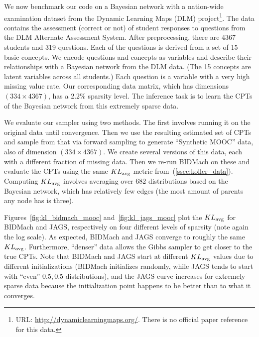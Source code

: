 \documentclass{article} %
\begin{document}
We now benchmark our code on a Bayesian network with a nation-wide examination dataset from the
Dynamic Learning Maps (DLM) project\footnote{URL: \url{http://dynamiclearningmaps.org/}. There is no
official paper reference for this data.}. The data contains the assessment (correct or not) of
student responses to questions from the DLM Alternate Assessment System. After preprocessing, there
are 4367 students and 319 questions. Each of the questions is derived from a set of 15 basic
concepts. We encode questions and concepts as variables and describe their relationships with a
Bayesian network from the DLM data. (The 15 concepts are latent variables across all students.) Each
question is a variable with a very high missing value rate.  Our corresponding data matrix, which
has dimensions $(334\times 4367)$, has a 2.2\% sparsity level. The inference task is to learn the
CPTs of the Bayesian network from this extremely sparse data.

We evaluate our sampler using two methods. The first involves running it on the original data until
convergence. Then we use the resulting estimated set of CPTs and sample from that via forward
sampling to generate ``Synthetic MOOC'' data, also of dimension $(334 \times 4367)$. We create
several versions of this data, each with a different fraction of missing data. Then we re-run
BIDMach on these and evaluate the CPTs using the same $KL_{\rm avg}$ metric
from~(\ref{ssec:koller_data}). Computing $KL_{\rm avg}$ involves averaging over 682 distributions
based on the Bayesian network, which has relatively few edges (the most amount of parents any node
has is three).

Figures~\ref{fig:kl_bidmach_mooc} and~\ref{fig:kl_jags_mooc} plot the $KL_{\rm avg}$ for BIDMach and
JAGS, respectively on four different levels of sparsity (note again the log scale). As expected,
BIDMach and JAGS converge to roughly the same $KL_{\rm avg}$. Furthermore, ``denser'' data allows
the Gibbs sampler to get closer to the true CPTs. Note that BIDMach and JAGS start at different
$KL_{\rm avg}$ values due to different initializations (BIDMach initializes randomly, while JAGS
tends to start with ``even'' $0.5,0.5$ distributions), and the JAGS curve increases for extremely
sparse data because the initialization point happens to be better than to what it converges.
\end{document}
